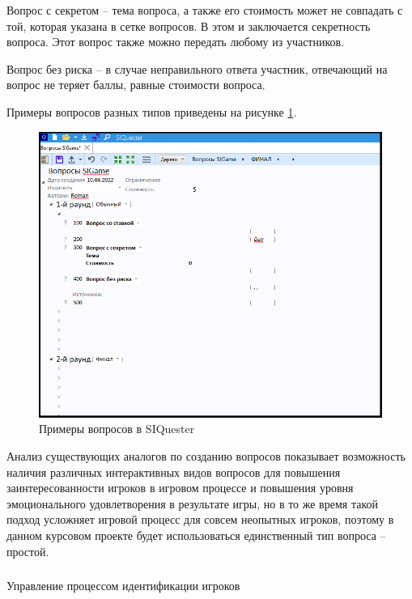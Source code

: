 Вопрос с секретом -- тема вопроса, а также его стоимость может не совпадать с той, которая указана в сетке вопросов. В этом и заключается секретность вопроса. Этот вопрос также 
можно передать любому из участников.

Вопрос без риска -- в случае неправильного ответа участник, отвечающий на вопрос не теряет баллы, равные стоимости вопроса.

Примеры вопросов разных типов приведены на рисунке \ref*{sec:analysis:analogues:create_quest:siquester_types}.

\begin{figure}[!ht]
	\centering
	\includegraphics[scale=0.6]{attachments/siquester_types.png}  
	\caption{Примеры вопросов в SIQuester}
	\label{sec:analysis:analogues:create_quest:siquester_types}
\end{figure}

Анализ существующих аналогов по созданию вопросов показывает возможность наличия различных интерактивных видов вопросов для повышения заинтересованности игроков 
в игровом процессе и повышения уровня эмоционального удовлетворения в результате игры, но в то же время такой подход усложняет игровой процесс для совсем неопытных игроков,
поэтому в данном курсовом проекте будет использоваться единственный тип вопроса -- простой.

\subsubsection{} Управление процессом идентификации игроков
\label{sec:analysis:analogues:create_acc}

